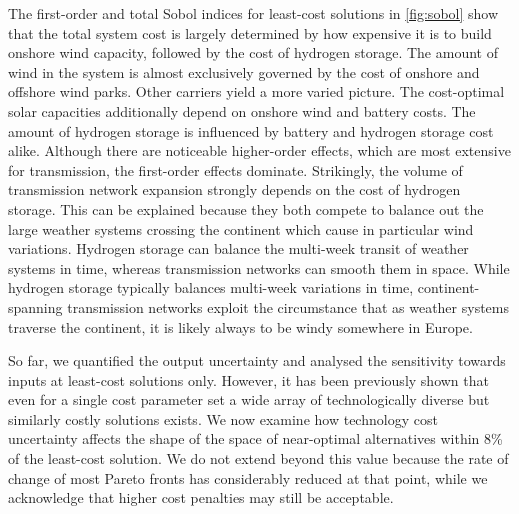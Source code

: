 The first-order and total Sobol indices for least-cost solutions in
\cref{fig:sobol} show that the total system cost is largely determined by how
expensive it is to build onshore wind capacity, followed by the cost of hydrogen
storage. The amount of wind in the system is almost exclusively governed by the
cost of onshore and offshore wind parks. Other carriers yield a more varied
picture. The cost-optimal solar capacities additionally depend on onshore wind
and battery costs. The amount of hydrogen storage is influenced by battery and
hydrogen storage cost alike. Although there are noticeable higher-order effects,
which are most extensive for transmission, the first-order effects dominate.
Strikingly, the volume of transmission network expansion strongly depends on the
cost of hydrogen storage. This can be explained because they both compete to
balance out the large weather systems crossing the continent which cause in
particular wind variations. Hydrogen storage can balance the multi-week transit
of weather systems in time, whereas transmission networks can smooth them in
space. While hydrogen storage typically balances multi-week variations in time,
continent-spanning transmission networks exploit the circumstance that as
weather systems traverse the continent, it is likely always to be windy
somewhere in Europe.


So far, we quantified the output uncertainty and analysed the sensitivity
towards inputs at least-cost solutions only. However, it has been previously
shown that even for a single cost parameter set a wide array of technologically
diverse but similarly costly solutions
exists.\cite{nearoptimal,pedersen_modeling_2020,lombardi_policy_2020,pickeringDiversityOptions2022}
We now examine how technology cost uncertainty affects the shape of the space of
near-optimal alternatives within 8\% of the least-cost solution. We do not
extend beyond this value because the rate of change of most Pareto fronts has
considerably reduced at that point, while we acknowledge that higher cost
penalties may still be acceptable.

